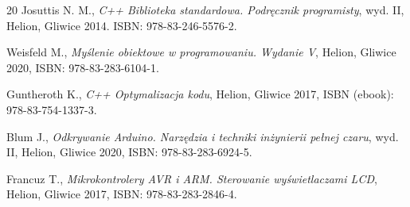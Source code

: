 \documentclass{SGGW-thesis}
\begin{document}
\begin{thebibliography}{20}
  Josuttis N. M.,
  \emph{C++ Biblioteka standardowa. Podręcznik programisty}, wyd. II, Helion, Gliwice 2014.
  ISBN: 978-83-246-5576-2.

  Weisfeld M.,
  \emph{Myślenie obiektowe w programowaniu. Wydanie V}, Helion, Gliwice 2020,
  ISBN: 978-83-283-6104-1.

  Guntheroth K.,
  \emph{C++ Optymalizacja kodu}, Helion, Gliwice 2017,
  ISBN (ebook): 978-83-754-1337-3.

  Blum J.,
  \emph{Odkrywanie Arduino. Narzędzia i techniki inżynierii pełnej czaru}, wyd. II, Helion, Gliwice 2020,
  ISBN: 978-83-283-6924-5.

  Francuz T.,
  \emph{Mikrokontrolery AVR i ARM. Sterowanie wyświetlaczami LCD}, Helion, Gliwice 2017,
  ISBN: 978-83-283-2846-4.
\end{thebibliography}

\listoffigures
\listoftables
\end{document}
